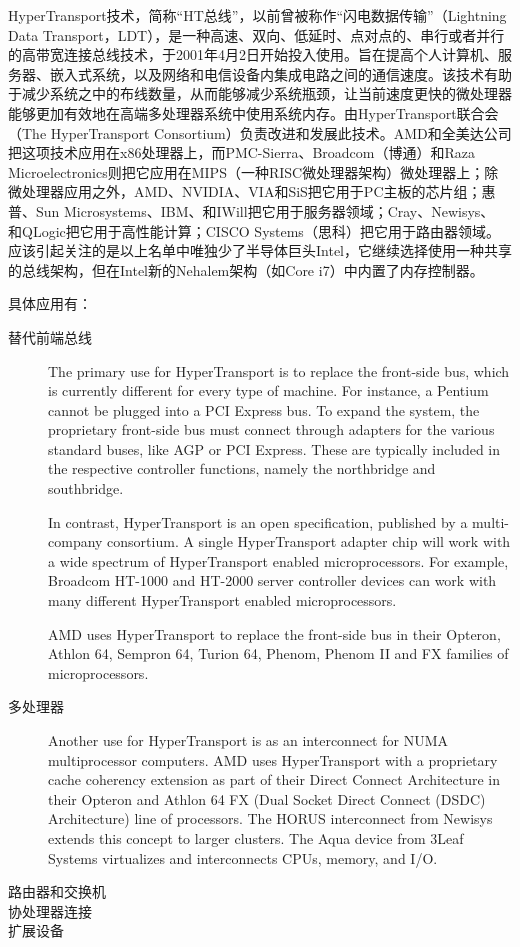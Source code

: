 HyperTransport技术，简称“HT总线”，以前曾被称作“闪电数据传输”（Lightning Data Transport，LDT），是一种高速、双向、低延时、点对点的、串行或者并行的高带宽连接总线技术，于2001年4月2日开始投入使用。旨在提高个人计算机、服务器、嵌入式系统，以及网络和电信设备内集成电路之间的通信速度。该技术有助于减少系统之中的布线数量，从而能够减少系统瓶颈，让当前速度更快的微处理器能够更加有效地在高端多处理器系统中使用系统内存。由HyperTransport联合会（The HyperTransport Consortium）负责改进和发展此技术。AMD和全美达公司把这项技术应用在x86处理器上，而PMC-Sierra、Broadcom（博通）和Raza Microelectronics则把它应用在MIPS（一种RISC微处理器架构）微处理器上；除微处理器应用之外，AMD、NVIDIA、VIA和SiS把它用于PC主板的芯片组；惠普、Sun Microsystems、IBM、和IWill把它用于服务器领域；Cray、Newisys、 和QLogic把它用于高性能计算；CISCO Systems（思科）把它用于路由器领域。应该引起关注的是以上名单中唯独少了半导体巨头Intel，它继续选择使用一种共享的总线架构，但在Intel新的Nehalem架构（如Core i7）中内置了内存控制器。


具体应用有：
\begin{description}
	\item[替代前端总线]The primary use for HyperTransport is to replace the front-side bus, which is currently different for every type of machine. For instance, a Pentium cannot be plugged into a PCI Express bus. To expand the system, the proprietary front-side bus must connect through adapters for the various standard buses, like AGP or PCI Express. These are typically included in the respective controller functions, namely the northbridge and southbridge.

		In contrast, HyperTransport is an open specification, published by a multi-company consortium. A single HyperTransport adapter chip will work with a wide spectrum of HyperTransport enabled microprocessors. For example, Broadcom HT-1000 and HT-2000 server controller devices can work with many different HyperTransport enabled microprocessors.

		AMD uses HyperTransport to replace the front-side bus in their Opteron, Athlon 64, Sempron 64, Turion 64, Phenom, Phenom II and FX families of microprocessors.
	\item[多处理器]Another use for HyperTransport is as an interconnect for NUMA multiprocessor computers. AMD uses HyperTransport with a proprietary cache coherency extension as part of their Direct Connect Architecture in their Opteron and Athlon 64 FX (Dual Socket Direct Connect (DSDC) Architecture) line of processors. The HORUS interconnect from Newisys extends this concept to larger clusters. The Aqua device from 3Leaf Systems virtualizes and interconnects CPUs, memory, and I/O.
	\item[路由器和交换机]
	\item[协处理器连接]
	\item[扩展设备]
\end{description}


